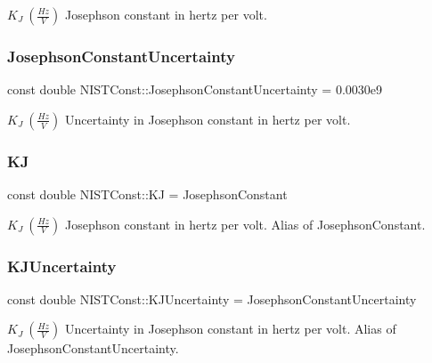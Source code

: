 $K_J \ (\frac{Hz}{V})$ Josephson constant in hertz per volt. \mbox{\label{group___n_i_s_t_const-_josephson_constant_gaa10eadf7c1811f94c5b5725ad300a099}} 
\subsubsection{\texorpdfstring{Josephson\+Constant\+Uncertainty}{JosephsonConstantUncertainty}}
{\footnotesize\ttfamily const double N\+I\+S\+T\+Const\+::\+Josephson\+Constant\+Uncertainty = 0.\+0030e9}

$K_J \ (\frac{Hz}{V})$ Uncertainty in Josephson constant in hertz per volt. \mbox{\label{group___n_i_s_t_const-_josephson_constant_ga75e8a1fd7b1434083e96c2f0291eb756}} 
\subsubsection{\texorpdfstring{KJ}{KJ}}
{\footnotesize\ttfamily const double N\+I\+S\+T\+Const\+::\+KJ = Josephson\+Constant}

$K_J \ (\frac{Hz}{V})$ Josephson constant in hertz per volt. Alias of Josephson\+Constant. \mbox{\label{group___n_i_s_t_const-_josephson_constant_ga8501536b42a3f29278ec30b3bf054321}} 
\subsubsection{\texorpdfstring{K\+J\+Uncertainty}{KJUncertainty}}
{\footnotesize\ttfamily const double N\+I\+S\+T\+Const\+::\+K\+J\+Uncertainty = Josephson\+Constant\+Uncertainty}

$K_J \ (\frac{Hz}{V})$ Uncertainty in Josephson constant in hertz per volt. Alias of Josephson\+Constant\+Uncertainty. 